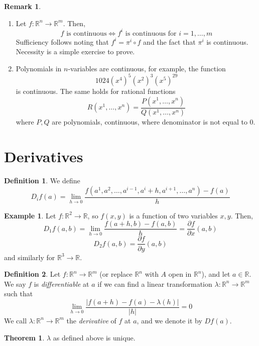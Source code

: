 \documentclass[a4paper,14pt]{extarticle}
\theoremstyle{definition}
\newtheorem*{theorem}{Theorem}
\newtheorem*{definition}{Definition}
\newtheorem*{eg}{Example}
\newtheorem*{remark}{Remark}
\begin{document}
\begin{remark} \hfill
	\begin{enumerate}
		\item Let $f:\mathbb{R}^n\rightarrow\mathbb{R}^m$. Then, \[f\text{ is continuous}\iff f^i\text{ is continuous for }i=1,\ldots,m\]
			Sufficiency follows noting that $f^i=\pi^i\circ f$ and the fact that $\pi^i$ is continuous. Necessity is a simple exercise to prove.
		\item Polynomials in $n$-variables are continuous, for example, the function \[1024(x^4)^5(x^2)^3(x^5)^{29}\] is continuous. The same holds for rational functions
			\[R(x^1,\ldots,x^n)=\frac{P(x^1,\ldots,x^n)}{Q(x^1,\ldots,x^n)}\] where $P,Q$ are polynomials, continuous, where denominator is not equal to 0.
	\end{enumerate}
\end{remark}

\section{Derivatives}
\begin{definition}
	We define \[D_if(a)=\lim\limits_{h\to0}\frac{f(a^1,a^2,\ldots,a^{i-1},a^i+h,a^{i+1},\ldots,a^n)-f(a)}{h}\]
\end{definition}

\begin{eg}
	Let $f:\mathbb{R}^2\rightarrow\mathbb{R}$, so $f(x,y)$ is a function of two variables $x,y$. Then, 
	\[D_1f(a,b)=\lim\limits_{h\to0}\frac{f(a+h,b)-f(a,b)}{h}=\frac{\partial f}{\partial x}(a,b)\]
	\[D_2f(a,b)=\frac{\partial f}{\partial y}(a,b)\]
	and similarly for $\mathbb{R}^3\rightarrow\mathbb{R}$.
\end{eg}

\begin{definition}
	Let $f:\mathbb{R}^n\rightarrow\mathbb{R}^m$ (or replace $\mathbb{R}^n$ with $A$ open in $\mathbb{R}^n$), and let $a\in\mathbb{R}$. We say $f$ is \emph{differentiable}
	at $a$ if we can find a linear transformation $\lambda:\mathbb{R}^n\rightarrow\mathbb{R}^m$ such that 
	\begin{equation}
	\lim\limits_{h\to0}\frac{|f(a+h)-f(a)-\lambda(h)|}{|h|}=0
	\end{equation} We call $\lambda:\mathbb{R}^n\rightarrow\mathbb{R}^m$ the \emph{derivative} of $f$ at $a$, and we denote
	it by $Df(a)$.
\end{definition}

\begin{theorem}
	$\lambda$ as defined above is unique.
\end{theorem}
\end{document}
